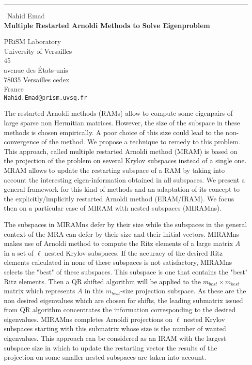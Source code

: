 \documentclass{report}
\begin{document}
\begin{center}
\rule{6in}{1pt} \
{\large Nahid Emad \\
{\bf Multiple Restarted Arnoldi Methods to Solve Eigenproblem}}

PRiSM Laboratory \\ University of Versailles \\ 45 \\ avenue des \'Etats-unis \\ 78035 Versailles cedex \\ France
\\
{\tt Nahid.Emad@prism.uvsq.fr}\end{center}

The restarted Arnoldi methods (RAMs) allow to compute some
eigenpairs of large sparse non Hermitian matrices. However, the size
of the subspace in these methods is chosen empirically. A poor
choice of this size could lead to the non-convergence of the method.
We propose a technique to remedy to this problem. This approach,
called multiple restarted Arnoldi method (MRAM) is based on the
projection of the problem on several Krylov subspaces instead of a
single one. MRAM allows to update the restarting subspace of a RAM
by taking into account the interesting eigen-information obtained in
all subspaces. We present a general framework for this kind of
methods and an adaptation of its concept to the
explicitly/implicitly restarted Arnoldi method (ERAM/IRAM). We focus
then on a particular case of MIRAM with nested subspaces (MIRAMns).

The subspaces in MIRAMns defer by their size while the subspaces in
the general context of the MRA can defer by their size and their
initial vectors. MIRAMns makes use of Arnoldi method to compute the
Ritz elements of a large matrix $A$ in a set of $\ell$ nested Krylov
subspaces. If the accuracy of the desired Ritz elements calculated
in none of these subspaces is not satisfactory, MIRAMns selects the
"best" of these subspaces. This subspace is one that contains the
"best" Ritz elements. Then a QR shifted algorithm will be applied to
the $m_{best}\times m_{best}$ matrix which represents $A$ in this
$m_{best}$-size projection subspace. As these are the non desired
eigenvalues which are chosen for shifts, the leading submatrix
issued from QR algorithm concentrates the information corresponding
to the desired eigenvalues. MIRAMns completes Arnoldi projections on
$\ell$ nested Krylov subspaces starting with this submatrix whose
size is the number of wanted eigenvalues. This approach can be
considered as an IRAM with the largest subspace size in which to
update the restarting vector the results of the projection on some
smaller nested subspaces are taken into account.
\end{document}
